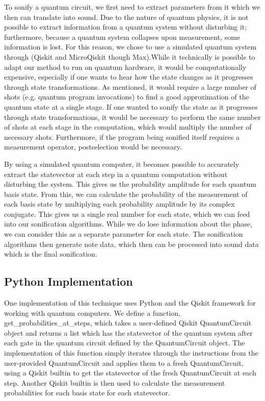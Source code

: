 \documentclass[10pt,twocolumn]{article}
\begin{document}
To sonify a quantum circuit, we first need to extract parameters from it which we then can translate into sound. Due to the nature of quantum physics, it is not possible to extract information from a quantum system without disturbing it; furthermore, because a quantum system collapses upon measurement, some information is lost. For this reason, we chose to use a simulated quantum system through (Qiskit\cite{qiskit} and MicroQiskit\cite{microqiskit} though Max\cite{maxmsp}).While it technically is possible to adapt our method to run on quantum hardware, it would be computationally expensive, especially if one wants to hear how the state changes as it progresses through state transformations. As mentioned, it would require a large number of shots (e.g. quantum program invocations) to find a good approximation of the quantum state at a single stage\cite{qiskitalgos}. If one wanted to sonify the state as it progresses through state transformations, it would be necessary to perform the same number of shots at each stage in the computation, which would multiply the number of necessary shots. Furthermore, if the program being sonified itself requires a measurement operator, postselection would be necessary.

By using a simulated quantum computer, it becomes possible to accurately extract the statevector at each step in a quantum computation without disturbing the system. This gives us the probability amplitude for each quantum basis state. From this, we can calculate the probability of the measurement of each basis state by multiplying each probability amplitude by its complex conjugate. This gives us a single real number for each state, which we can feed into our sonification algorithms. While we do lose information about the phase, we can consider this as a separate parameter for each state. The sonification algorithms then generate note data, which then can be processed into sound data which is the final sonification.

\subsection{Python Implementation}

One implementation of this technique uses Python and the Qiskit\cite{qiskit} framework for working with quantum computers. We define a function, get\_probabilities\_at\_steps, which takes a user-defined Qiskit QuantumCircuit object and returns a list which has the statevector of the quantum system after each gate in the quantum circuit defined by the QuantumCircuit object. The implementation of this function simply iterates through the instructions from the user-provided QuantumCircuit and applies them to a fresh QuantumCircuit, using a Qiskit builtin to get the statevector of the fresh QuantumCircuit at each step. Another Qiskit builtin is then used to calculate the measurement probabilities for each basis state for each statevector.
\end{document}
